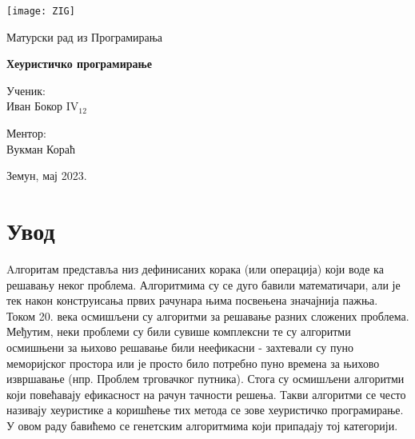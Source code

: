 \documentclass{article}
\begin{document}

\thispagestyle{empty}

\graphicspath{{./images/}}

\begin{center}
    \texttt{[image: ZIG]}
\end{center}

\vspace*{20mm}

\begin{center}
    \Large Матурски рад из Програмирања

    \vspace*{8pt}

    \Huge \textbf{Хеуристичко програмирање}
\end{center}

\vspace*{40mm}

\setlength{\columnsep}{50pt}
\begin{multicols}{2}
 {\noindent \large Ученик:
\\Иван Бокор  IV$_{12}$}

 {\noindent \hfill \large \centering{}Ментор: \\
 \hfill \phantom{111} Вукман Кораћ}

\end{multicols}

\vfill

\begin{center}
    \Large Земун, мај 2023.
\end{center}

\newpage


\tableofcontents


\newpage
{}

\section{Увод}

Aлгоритам представља низ дефинисаних корака (или операција) који воде ка
решавању неког проблема. Алгоритмима су се дуго бавили математичари, али је 
тек након конструисања првих рачунара њима посвењена значајнија пажња. Током 
20. века осмишљени су алгоритми за решавање разних сложених проблема.  Међутим,
неки проблеми су били сувише комплексни те су алгоритми осмишњени за њихово
решавање били неефикасни - захтевали су пуно меморијског простора или је просто 
било потребно пуно времена за њихово извршавање (нпр. Проблем трговачког путника).
Стога су осмишљени алгоритми који повећавају ефикасност на рачун тачности решења.
Такви алгоритми се често називају хеуристике а коришћење тих метода се зове хеуристичко програмирање.
У овом раду бавићемо се генетским алгоритмима који припадају тој категорији.
\end{document}
